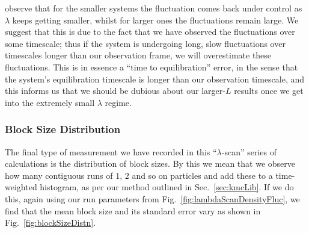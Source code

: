 observe that for the smaller systems the fluctuation comes back under control as $\lambda$ keeps getting
smaller, whilst for larger ones the fluctuations remain large. We suggest that this is due to the fact
that we have observed the fluctuations over some timescale; thus if the system is undergoing long, slow
fluctuations over timescales longer than our observation frame, we will overestimate these fluctuations.
This is in essence a ``time to equilibration'' error, in the sense that the system's equilibration
timescale is longer than our observation timescale, and this informs us that we should be dubious about
our larger-$L$ results once we get into the extremely small $\lambda$ regime.

\subsubsection{Block Size Distribution}
The final type of measurement we have recorded in this ``$\lambda$-scan'' series of calculations is
the distribution of block sizes. By this we mean that we observe how many contiguous runs of $1$, $2$ 
and so on particles and add these to a time-weighted histogram, as per our method outlined in
Sec.~\ref{sec:kmcLib}. If we do this, again using our run parameters from
Fig.~\ref{fig:lambdaScanDensityFluc}, we find that the mean block size and its standard error vary
as shown in Fig.~\ref{fig:blockSizeDistn}.
